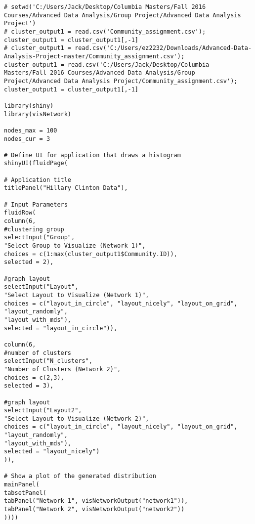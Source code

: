 \begin{verbatim}
# setwd('C:/Users/Jack/Desktop/Columbia Masters/Fall 2016 Courses/Advanced Data Analysis/Group Project/Advanced Data Analysis Project')
# cluster_output1 = read.csv('Community_assignment.csv'); cluster_output1 = cluster_output1[,-1]
# cluster_output1 = read.csv('C:/Users/ez2232/Downloads/Advanced-Data-Analysis-Project-master/Community_assignment.csv');
cluster_output1 = read.csv('C:/Users/Jack/Desktop/Columbia Masters/Fall 2016 Courses/Advanced Data Analysis/Group Project/Advanced Data Analysis Project/Community_assignment.csv'); 
cluster_output1 = cluster_output1[,-1]

library(shiny)
library(visNetwork)

nodes_max = 100
nodes_cur = 3

# Define UI for application that draws a histogram
shinyUI(fluidPage(

# Application title
titlePanel("Hillary Clinton Data"),

# Input Parameters
fluidRow(
column(6,
#clustering group
selectInput("Group",
"Select Group to Visualize (Network 1)",
choices = c(1:max(cluster_output1$Community.ID)),
selected = 2),

#graph layout
selectInput("Layout",
"Select Layout to Visualize (Network 1)",
choices = c("layout_in_circle", "layout_nicely", "layout_on_grid", "layout_randomly",
"layout_with_mds"),
selected = "layout_in_circle")),

column(6,
#number of clusters
selectInput("N_clusters",
"Number of Clusters (Network 2)",
choices = c(2,3),
selected = 3),

#graph layout
selectInput("Layout2",
"Select Layout to Visualize (Network 2)",
choices = c("layout_in_circle", "layout_nicely", "layout_on_grid", "layout_randomly",
"layout_with_mds"),
selected = "layout_nicely")
)),

# Show a plot of the generated distribution
mainPanel(
tabsetPanel(
tabPanel("Network 1", visNetworkOutput("network1")),
tabPanel("Network 2", visNetworkOutput("network2"))
))))
\end{verbatim}